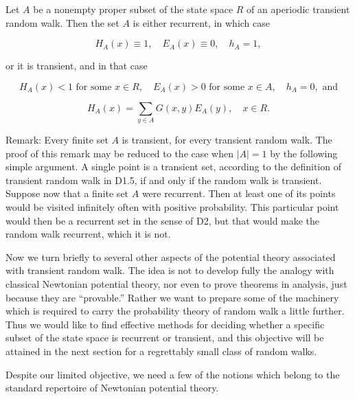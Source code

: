 Let $A$ be a nonempty proper subset of the state space $R$ of an aperiodic transient random walk. Then the set $A$ is either recurrent, in which case

$$H_A(x) \equiv 1, \quad E_A(x) \equiv 0, \quad h_A = 1,$$

or it is transient, and in that case

$$H_A(x) < 1 \text{ for some } x \in R, \quad E_A(x) > 0 \text{ for some } x \in A, \quad h_A = 0, \text{ and}$$

$$H_A(x) = \sum_{y \in A} G(x,y)E_A(y), \quad x \in R.$$

Remark: Every finite set $A$ is transient, for every transient random walk. The proof of this remark may be reduced to the case when $|A| = 1$ by the following simple argument. A single point is a transient set, according to the definition of transient random walk in D1.5, if and only if the random walk is transient. Suppose now that a finite set $A$ were recurrent. Then at least one of its points would be visited infinitely often with positive probability. This particular point would then be a recurrent set in the sense of D2, but that would make the random walk recurrent, which it is not.

Now we turn briefly to several other aspects of the potential theory associated with transient random walk. The idea is not to develop fully the analogy with classical Newtonian potential theory, nor even to prove theorems in analysis, just because they are “provable.” Rather we want to prepare some of the machinery which is required to carry the probability theory of random walk a little further. Thus we would like to find effective methods for deciding whether a specific subset of the state space is recurrent or transient, and this objective will be attained in the next section for a regrettably small class of random walks.

Despite our limited objective, we need a few of the notions which belong to the standard repertoire of Newtonian potential theory.